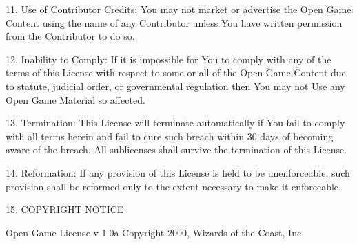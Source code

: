 \documentclass[a4paper, twocolumn, 10pt]{book}
\begin{document}
11. Use of Contributor Credits: You may not market or advertise the Open Game Content using the name of any Contributor unless You have written permission from the Contributor to do so.

12. Inability to Comply: If it is impossible for You to comply with any of the terms of this License with respect to some or all of the Open Game Content due to statute, judicial order, or governmental regulation then You may not Use any Open Game Material so affected.

13. Termination: This License will terminate automatically if You fail to comply with all terms herein and fail to cure such breach within 30 days of becoming aware of the breach. All sublicenses shall survive the termination of this License.

14. Reformation: If any provision of this License is held to be unenforceable, such provision shall be reformed only to the extent necessary to make it enforceable.

15. COPYRIGHT NOTICE

Open Game License v 1.0a Copyright 2000, Wizards of the Coast, Inc.
\end{document}
